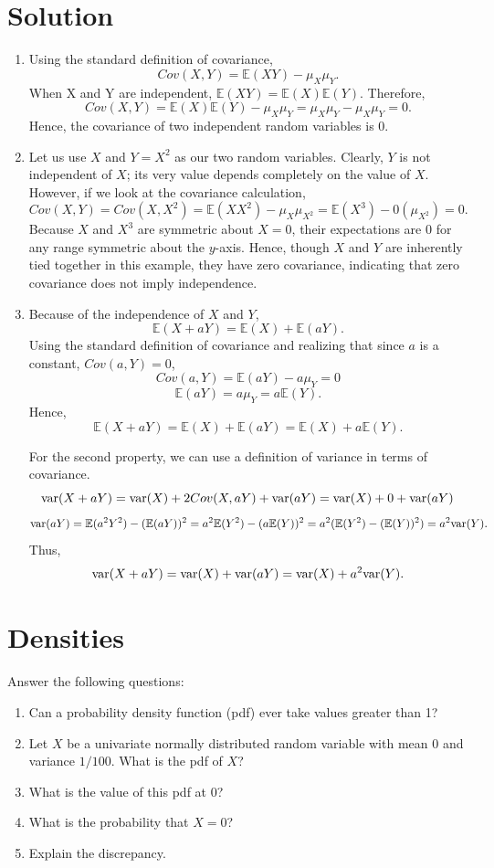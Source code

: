 \documentclass[submit]{harvardml}
\newcommand{\E}{\mathbb{E}}
\begin{document}
\section*{Solution}

\begin{enumerate}[label=(\alph*)]
    \item Using the standard definition of covariance,\[Cov(X,Y) = \E(X Y) - \mu_X \mu_Y.\] When X and Y are independent, $\E(X Y) = \E(X) \E(Y)$. Therefore,\[Cov(X,Y) = \E(X) \E(Y) - \mu_X \mu_Y = \mu_X \mu_Y - \mu_X \mu_Y = 0.\] Hence, the covariance of two independent random variables is $0$.
    \item Let us use $X$ and $Y = X^2$ as our two random variables. Clearly, $Y$ is not independent of $X$; its very value depends completely on the value of $X$. However, if we look at the covariance calculation,\[Cov(X,Y) = Cov(X,X^2) = \E(X X^2) - \mu_X \mu_{X^2} = \E(X^3) - 0 (\mu_{X^2}) = 0.\] Because $X$ and $X^3$ are symmetric about $X = 0$, their expectations are 0 for any range symmetric about the $y$-axis. Hence, though $X$ and $Y$ are inherently tied together in this example, they have zero covariance, indicating that zero covariance does not imply independence.
    \item Because of the independence of $X$ and $Y$,\[\E(X + aY) = \E(X) + \E(aY).\] Using the standard definition of covariance and realizing that since $a$ is a constant, $Cov(a,Y) = 0$,\[Cov(a,Y) = \E(aY) - a \mu_Y = 0\]\[\E(aY) = a \mu_Y = a \E(Y).\] Hence,\[\E(X + aY) = \E(X) + \E(aY) = \E(X) + a \E(Y).\]
    
    For the second property, we can use a definition of variance in terms of covariance.\[\mathrm{var}(X + aY) = \mathrm{var}(X) + 2 Cov(X,aY) + \mathrm{var}(aY) = \mathrm{var}(X) + 0 + \mathrm{var}(aY)\]\[\var(aY) = \E(a^2 Y^2) - (\E(aY))^2 = a^2 \E(Y^2) - (a \E(Y))^2 = a^2 (\E(Y^2) - (\E(Y))^2) = a^2 \var(Y).\] Thus,\[\mathrm{var}(X + aY) = \mathrm{var}(X) + \mathrm{var}(aY) = \mathrm{var}(X) + a^2 \mathrm{var}(Y).\]
\end{enumerate}

\newpage
\section*{Densities}
\begin{problem}
Answer the following questions:
\begin{enumerate}[label=(\alph*)]
  \item Can a probability density function (pdf) ever take values greater than 1?
  \item Let $X$ be a univariate normally distributed random variable with mean 0
        and variance $1/100$. What is the pdf of $X$?
  \item What is the value of this pdf at 0?
  \item What is the probability that $X = 0$?
  \item Explain the discrepancy.
\end{enumerate}
\end{problem}
\end{document}
